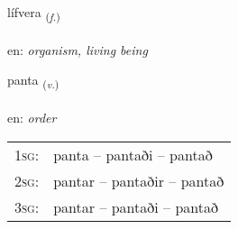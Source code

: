 \documentclass[frontgrid, backgrid]{flacards}\usepackage[]{graphicx}\usepackage[]{color}
\begin{document}
\renewcommand{\flhead}{\vskip5pt \fboxsep=0pt {\small\bfseries\footnotesize Nafnorð | Noun}}
\renewcommand{\fcfoot}{\vskip5pt \fboxsep=0pt \hspace{2pt}{\small\bfseries\footnotesize 2K}}

\renewcommand{\blhead}{\vskip5pt {\small\bfseries\footnotesize Nafnorð | Noun }}
\renewcommand{\bcfoot}{\vskip5pt \hspace{2pt}{\small\bfseries\footnotesize 2K}}


{lífvera \small{\textsubscript{(\textit{f.})}} \\[1ex] %
\textphonetic{[livɛra]} \\
en: \emph{organism, living being} \\  [2ex]
\renewcommand*{\arraystretch}{0.8}
}

\renewcommand{\flhead}{\vskip5pt \fboxsep=0pt {\small\bfseries\footnotesize Sagnorð | Verb}}
\renewcommand{\fcfoot}{\vskip5pt \fboxsep=0pt \hspace{2pt}{\small\bfseries\footnotesize 2K}}

\renewcommand{\blhead}{\vskip5pt {\small\bfseries\footnotesize Sagnorð | Verb }}
\renewcommand{\bcfoot}{\vskip5pt \hspace{2pt}{\small\bfseries\footnotesize 2K}}


{panta \small{\textsubscript{(\textit{v.})}} \\[1ex] %
\textphonetic{[pʰan̥ta]} \\
en: \emph{order} \\  [2ex]
\renewcommand*{\arraystretch}{0.8}
\begin{tabular}{p{1cm}l}
\textsc{1sg}: & panta -- pantaði -- pantað \\ 
\textsc{2sg}: & pantar -- pantaðir -- pantað \\ 
\textsc{3sg}: & pantar -- pantaði -- pantað \\ 
\end{tabular}
}
\end{document}
